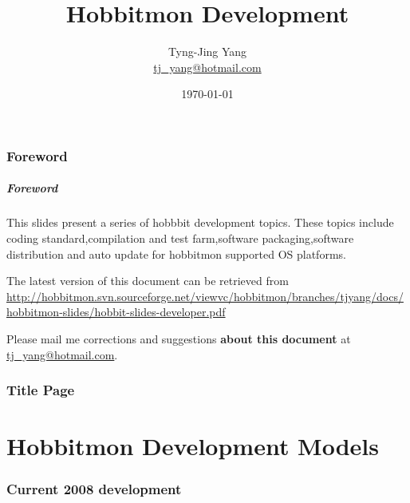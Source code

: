 \documentclass{beamer}
\title{Hobbitmon Development}
\author[T.J. Yang]{Tyng-Jing Yang \\\url{tj_yang@hotmail.com}}
\date{\today}
\newcommand{\mypart}[1]{\part{#1}\frame{\partpage \tableofcontents}}
\begin{document}
\section*{Foreword}
\begin{frame}
\frametitle{Foreword }

This slides present a series of hobbbit development topics. These topics include coding standard,compilation and test farm,software packaging,software distribution and auto update for hobbitmon supported OS platforms.



\bigskip

The latest version of this document can be retrieved from\\
{\small \url{http://hobbitmon.svn.sourceforge.net/viewvc/hobbitmon/branches/tjyang/docs/hobbitmon-slides/hobbit-slides-developer.pdf}}

\bigskip

Please mail me corrections and suggestions \textbf{about this
  document} at \url{tj_yang@hotmail.com}.

\end{frame}



\section*{Title Page}

\begin{frame}
  \titlepage

\centering
{}

\end{frame}


\mypart{Hobbitmon Development Models}

\section{Current 2008 development}
\end{document}
